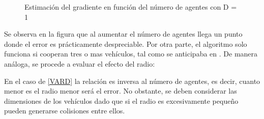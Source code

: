 \begin{figure}[htb]
  \begin{center}
    \caption{Estimación del gradiente en función del número de agentes con D = 1}
    \label{NAGENTSEST}
  \end{center}
\end{figure}

Se observa en la figura que al aumentar el número de agentes llega un punto donde el error es prácticamente despreciable. Por otra parte, el algoritmo solo funciona si cooperan tres o mas vehículos, tal como se anticipaba en \cite{Estimacion_Gradiente}. De manera análoga, se procede a evaluar el efecto del radio:

En el caso de \ref{VARD} la relación es inversa al número de agentes, es decir, cuanto menor es el radio menor será el error. No obstante, se deben considerar las dimensiones de los vehículos dado que si el radio es excesivamente pequeño pueden generarse colisiones entre ellos.

